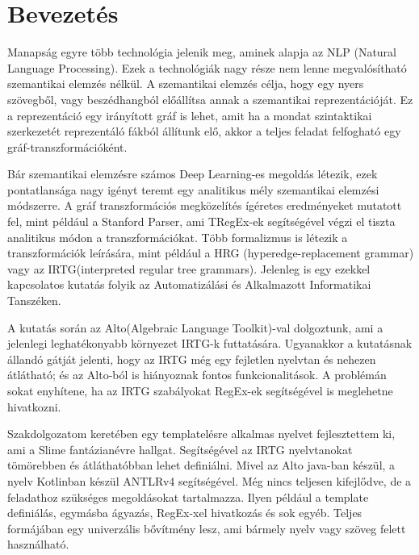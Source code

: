 \chapter{Bevezetés}
\label{sec:introducton}

Manapság egyre több technológia jelenik meg, aminek alapja az NLP (Natural Language Processing). Ezek a technológiák nagy része nem lenne megvalósítható szemantikai elemzés nélkül. A szemantikai elemzés célja, hogy egy nyers szövegből, vagy beszédhangból előállítsa annak a szemantikai reprezentációját. Ez a reprezentáció egy irányított gráf is lehet, amit ha a mondat szintaktikai szerkezetét reprezentáló fákból állítunk elő, akkor a teljes feladat felfogható egy gráf-transzformációként. 

Bár szemantikai elemzésre számos Deep Learning-es megoldás létezik, ezek pontatlansága nagy igényt teremt egy analitikus mély szemantikai elemzési módszerre. A gráf transzformációs megközelítés ígéretes eredményeket mutatott fel, mint például a Stanford Parser, ami TRegEx-ek segítségével végzi el tiszta analitikus módon a transzformációkat.
Több formalizmus is létezik a transzformációk leírására, mint például a HRG (hyperedge-replacement grammar) vagy az IRTG(interpreted regular tree grammars). Jelenleg is egy ezekkel kapcsolatos kutatás folyik az Automatizálási és Alkalmazott Informatikai Tanszéken.

A kutatás során az Alto(Algebraic Language Toolkit)-val dolgoztunk, ami a jelenlegi leghatékonyabb környezet IRTG-k futtatására. Ugyanakkor a kutatásnak állandó gátját jelenti, hogy az IRTG még egy fejletlen nyelvtan és nehezen átlátható; és az Alto-ból is hiányoznak fontos funkcionalitások. A problémán sokat enyhítene, ha az IRTG szabályokat RegEx-ek segítségével is meglehetne hivatkozni.

Szakdolgozatom keretében egy templatelésre alkalmas nyelvet fejlesztettem ki, ami a Slime fantázianévre hallgat. Segítségével az IRTG nyelvtanokat tömörebben és átláthatóbban lehet definiálni. Mivel az Alto java-ban készül, a nyelv Kotlinban készül ANTLRv4 segítségével. Még nincs teljesen kifejlődve, de a feladathoz szükséges megoldásokat tartalmazza. Ilyen például a template definiálás, egymásba ágyazás, RegEx-xel hivatkozás és sok egyéb. Teljes formájában egy univerzális bővítmény lesz, ami bármely nyelv vagy szöveg felett használható.
 	 	 	
